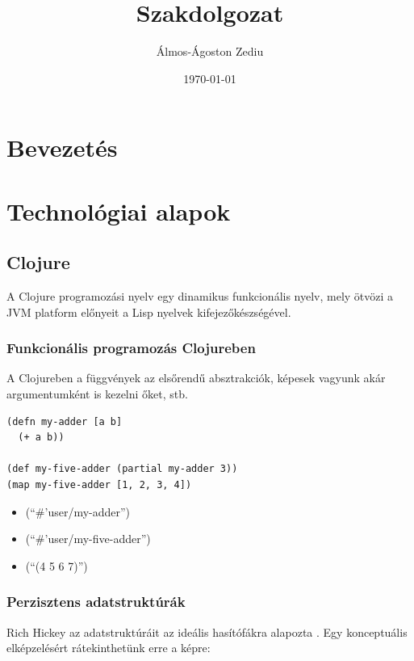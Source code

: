 \documentclass[final, 12pt] {ubb_dolgozat}{book}
\author{Álmos-Ágoston Zediu}
\date{\today}
\title{Szakdolgozat}
\begin{document}
\maketitle
\tableofcontents


\chapter{Bevezetés}
\label{sec:orge75e293}
\chapter{Technológiai alapok}
\label{sec:org6631bef}
\section{Clojure}
\label{sec:org676d80f}
A Clojure programozási nyelv egy dinamikus funkcionális nyelv, mely ötvözi a JVM platform előnyeit a Lisp nyelvek
kifejezőkészségével.
\subsection{Funkcionális programozás Clojureben}
\label{sec:orgad2e12f}

A Clojureben a függvények az elsőrendű absztrakciók, képesek vagyunk akár argumentumként is kezelni őket, stb.

\begin{verbatim}
(defn my-adder [a b]
  (+ a b))

(def my-five-adder (partial my-adder 3))
(map my-five-adder [1, 2, 3, 4])
\end{verbatim}

\begin{itemize}
\item (``\#'user/my-adder'')
\item (``\#'user/my-five-adder'')
\item (``(4 5 6 7)'')
\end{itemize}

\subsection{Perzisztens adatstruktúrák}
\label{sec:org27c12b4}
Rich Hickey az adatstruktúráit az ideális hasítófákra alapozta \citep{bagwellIdealHashTrees2001}. Egy konceptuális elképzelésért
rátekinthetünk erre a képre:
\end{document}
